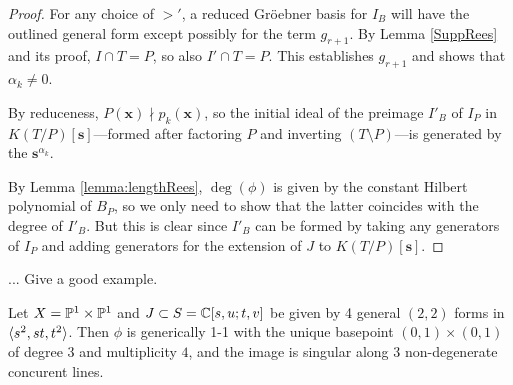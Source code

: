 \documentclass[fleqn,reqno]{amsart}
\numberwithin{first}{chapter}
\begin{document}
\begin{proof}
For any choice of $>'$, a reduced Gr\"oebner basis for $I_B$ will have the outlined general form
except possibly for the term $g_{r+1}$. By Lemma \ref{SuppRees} and its proof, $I\cap T=P$, so also
$I'\cap T=P$. This establishes $g_{r+1}$ and shows that $\alpha_k\neq0$.

By reduceness, $P(\mathbf x)\nmid p_k(\mathbf x)$, so the initial ideal of the preimage $I'_B$ of $I_P$
in $K(T/P)[\mathbf s]$---formed after factoring
$P$ and inverting $(T\setminus P)$---is generated by the $\mathbf s^{\alpha_k}$.

By Lemma \ref{lemma:lengthRees}, $\deg(\phi)$ is given by the constant Hilbert polynomial of $B_P$,
so we only need to show that the latter coincides with the degree of $I'_B$.
But this is clear since $I'_B$ can be formed by taking any generators of $I_P$
and adding generators for the extension of $J$ to $K(T/P)[\mathbf s]$.
%
%
%
\end{proof}

\begin{example}
... Give a good example.
\end{example}



\begin{conjecture}
\label{conj:nice-example}
Let $X=\mathbb{P}^1\times\mathbb{P}^1$ and $J\subset S=\mathbb{C}[s,u;t,v]$ be given by 4 general $(2,2)$ forms in $\langle s^2,st,t^2\rangle$.
Then $\phi$ is generically 1-1 with
the unique basepoint $(0,1)\times(0,1)$ of degree $3$ and multiplicity $4$,
and the image is singular along 3 non-degenerate concurent lines.
\end{conjecture}
\end{document}
